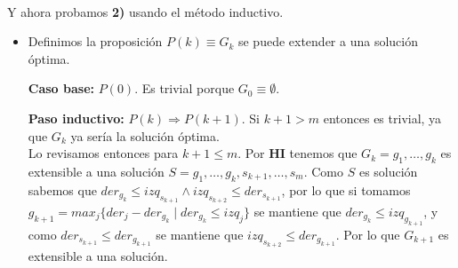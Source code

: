 \documentclass[./main.tex]{subfiles}
\begin{document}
\paragraph{} Y ahora probamos \textbf{2)} usando el método inductivo. \begin{itemize}
  \item Definimos la proposición \(P(k) \equiv G_k\) se puede extender a una solución óptima.
  \item[\textbf{Caso base:}] \(P(0)\). Es trivial porque \(G_0 \equiv \emptyset\).
  \item[\textbf{Paso inductivo:}] \(P(k) \Rightarrow P(k+1)\). Si \(k+1 > m\) entonces es trivial, ya que \(G_k\) ya sería la solución óptima. \\
    Lo revisamos entonces para \(k+1 \leq m\). Por \textbf{HI} tenemos que \(G_k = g_1, \ldots, g_k\) es extensible a una solución \(S = g_1, \ldots, g_k, s_{k+1}, \ldots, s_m\). Como \(S\) es solución sabemos que \(der_{g_k} \leq izq_{s_{k+1}} \land izq_{s_{k+2}} \leq der_{s_{k+1}}\), por lo que si tomamos \(g_{k+1} = max_j\{der_j - der_{g_k} \mid der_{g_k} \leq izq_j\}\) se mantiene que \(der_{g_k} \leq izq_{g_{k+1}}\), y como \(der_{s_{k+1}} \leq der_{g_{k+1}}\) se mantiene que \(izq_{s_{k+2}} \leq der_{g_{k+1}}\). Por lo que \(G_{k+1}\) es extensible a una solución. \done %
\end{itemize}
\end{document}
